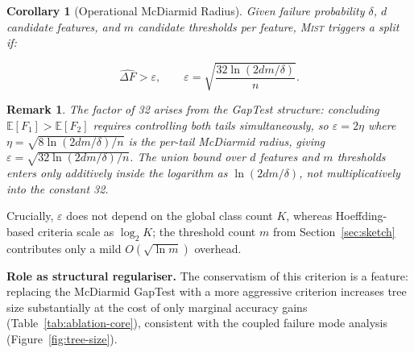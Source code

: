 \documentclass{article}
\newtheorem{corollary}[theorem]{Corollary}
\newtheorem{remark}[theorem]{Remark}
\newcommand{\mist}{\textsc{Mist}}
\begin{document}
\begin{corollary}[Operational McDiarmid Radius]
\label{cor:radius}
Given failure probability $\delta$, $d$ candidate features, and $m$
candidate thresholds per feature, \mist{} triggers a split if:

\begin{equation}
  \widehat{\Delta F} > \varepsilon, \qquad
  \varepsilon = \sqrt{\frac{32\ln(2dm/\delta)}{n}}.
  \label{eq:radius}
\end{equation}
\end{corollary}

\begin{remark}
The factor of 32 arises from the GapTest structure: concluding
$\mathbb{E}[F_1] > \mathbb{E}[F_2]$ requires controlling both tails
simultaneously, so $\varepsilon = 2\eta$ where $\eta =
\sqrt{8\ln(2dm/\delta)/n}$ is the per-tail McDiarmid radius, giving
$\varepsilon = \sqrt{32\ln(2dm/\delta)/n}$. The union bound over $d$
features and $m$ thresholds enters only additively inside the logarithm
as $\ln(2dm/\delta)$, not multiplicatively into the constant 32.
\end{remark}

Crucially, $\varepsilon$ does not depend on the global class count $K$,
whereas Hoeffding-based criteria scale as $\log_2 K$; the
threshold count $m$ from Section~\ref{sec:sketch} contributes only a
mild $O(\sqrt{\ln m})$ overhead.

\noindent
\textbf{Role as structural regulariser.}
The conservatism of this criterion is a feature:
replacing the McDiarmid GapTest with a more aggressive criterion
increases tree size substantially at the cost of only marginal accuracy gains
(Table~\ref{tab:ablation-core}), consistent with the coupled failure
mode analysis (Figure~\ref{fig:tree-size}).
\end{document}
